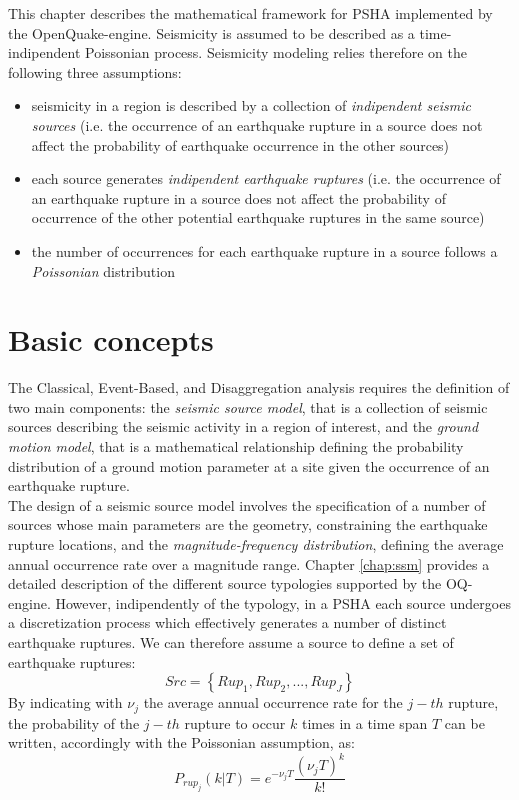 This chapter describes the mathematical framework for PSHA implemented by the OpenQuake-engine.
Seismicity is assumed to be described as a time-indipendent Poissonian process. Seismicity modeling
relies therefore on the following three assumptions:
\begin{itemize}
	\item seismicity in a region is described by a collection of \textit{indipendent seismic sources}
	(i.e. the occurrence of an earthquake rupture in a source does not affect the probability of
	earthquake occurrence in the other sources)
	\item each source generates \textit{indipendent earthquake ruptures} (i.e. the occurrence of an
	earthquake rupture in a source does not affect the probability of occurrence of the other
	potential earthquake ruptures in the same source)
	\item the number of occurrences for each earthquake rupture in a source follows a \textit{Poissonian}
	distribution
\end{itemize}

\section{Basic concepts}
The Classical, Event-Based, and Disaggregation analysis requires the definition of two main components:
the \textit{seismic source model}, that is a collection of seismic sources describing the seismic activity in a
region of interest, and the \textit{ground motion model}, that is a mathematical relationship defining the
probability distribution of a ground motion parameter at a site given the occurrence of an earthquake
rupture.\\
The design of a seismic source model involves the specification of a number of sources whose main parameters
are the geometry, constraining the earthquake rupture locations, and the \textit{magnitude-frequency
distribution}, defining the average annual occurrence rate over a magnitude range. Chapter \ref{chap:ssm} provides
a detailed description of the different source typologies supported by the OQ-engine. However, indipendently
of the typology, in a PSHA each source undergoes a discretization process which effectively generates a
number of distinct earthquake ruptures. We can therefore assume a source to define a set of earthquake ruptures:
\begin{equation}
Src = \left\{Rup_{1}, Rup_{2}, ..., Rup_{J}\right\}
\end{equation}
By indicating with $\nu_{j}$ the average annual occurrence rate for the $j-th$ rupture, the probability of the
$j-th$ rupture to occur $k$ times in a time span $T$ can be written, accordingly with the Poissonian assumption,
as:
\begin{equation}
\label{eq:poisson_pd}
P_{rup_{j}}(k | T) = e^{-\nu_{j} T} \frac{(\nu_{j} T) ^ {k}}{k!}
\end{equation}

